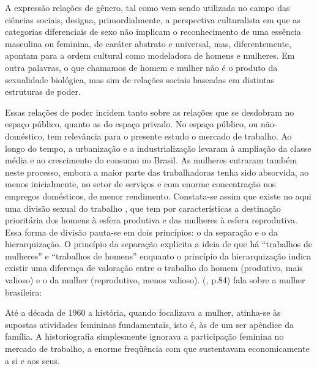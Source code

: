 \begin{citacao}
A expressão relações de gênero, tal como vem sendo utilizada no campo das ciências sociais, designa, primordialmente, a perspectiva culturalista em que as categorias diferenciais de sexo não implicam o reconhecimento de uma essência masculina ou feminina, de caráter abstrato e universal, mas, diferentemente, apontam para a ordem cultural como modeladora de homens e mulheres. Em outra palavras, o que chamamos de homem e mulher não é o produto da sexualidade biológica, mas sim de relações sociais baseadas em distintas estruturas de poder.
\end{citacao}

Essas relações de poder incidem tanto sobre as relações que se desdobram no espaço público, quanto as do espaço privado. No espaço público, ou não-doméstico, tem relevância para o presente estudo o mercado de trabalho. Ao longo do tempo, a urbanização e a industrialização levaram à ampliação da classe média e ao crescimento do consumo no Brasil. As mulheres entraram também neste processo, embora a maior parte das trabalhadoras tenha sido absorvida, ao menos inicialmente, no setor de serviços e com enorme concentração nos empregos domésticos, de menor rendimento. Constata-se assim que existe no aqui uma divisão sexual do trabalho \cite{KERGOAT2004}, que tem por características a destinação prioritária dos homens à esfera produtiva e das mulheres à esfera reprodutiva. Essa forma de divisão pauta-se em dois princípios: o da separação e o da hierarquização. O princípio da separação explicita a ideia de que há ``trabalhos de mulheres'' e ``trabalhos de homens'' enquanto o princípio da hierarquização indica existir uma diferença de valoração entre o trabalho do homem (produtivo, mais valioso) e o da mulher (reprodutivo, menos valioso).  (\citeyear{BLAY2001}, p.84) fala sobre a mulher brasileira:

\begin{citacao}
Até a década de 1960 a história, quando focalizava a mulher, atinha-se às supostas atividades femininas fundamentais, isto é, às de um ser apêndice da família. A historiografia simplesmente ignorava a participação feminina no mercado de trabalho, a enorme freqüência com que sustentavam economicamente a si e aos seus.
\end{citacao}

